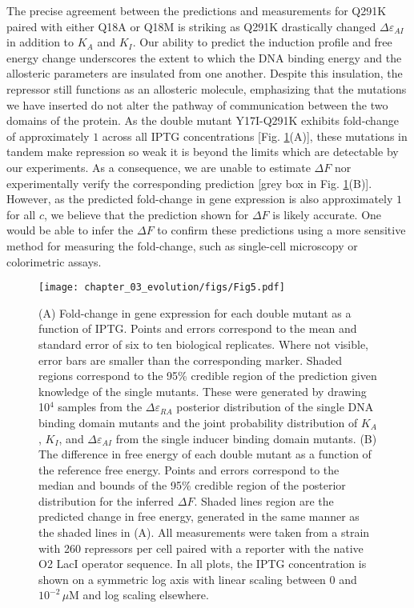 The precise agreement between the predictions and measurements for Q291K
paired with either Q18A or Q18M is striking as Q291K drastically changed
$\Delta\varepsilon_{AI}$ in addition to $K_A$ and $K_I$. Our ability to
predict the induction profile and free energy change underscores the extent
to which the DNA binding energy and the allosteric parameters are insulated
from one another. Despite this insulation, the repressor still functions as
an allosteric molecule, emphasizing that the mutations we have inserted do not
alter the pathway of communication between the two domains of
the protein. 
As the double mutant Y17I-Q291K exhibits fold-change of approximately $1$
across all IPTG concentrations [Fig. \ref{fig:dbl_muts}(A)], these mutations
in tandem make repression so weak it is beyond the limits which are
detectable by our experiments. As a consequence, we are unable to estimate
$\Delta F$ nor experimentally verify the corresponding prediction [grey box
in Fig. \ref{fig:dbl_muts}(B)]. However, as the predicted fold-change in gene
expression is also approximately $1$ for all $c$, we believe that the
prediction shown for $\Delta F$ is likely accurate. One would be able to
infer the $\Delta F$ to confirm these predictions using a more sensitive
method for measuring the fold-change, such as single-cell microscopy or
colorimetric assays. 

\begin{figure}
    \centering
    \texttt{[image: chapter\_03\_evolution/figs/Fig5.pdf]}
    \caption[Induction and free energy profiles of DNA binding and 
        inducer binding double mutants.]{(A) Fold-change in gene expression for
        each double mutant as a function of IPTG. Points and errors correspond
        to the mean and standard error of six to ten biological replicates.
        Where not visible, error bars are smaller than the corresponding marker. Shaded
        regions correspond to the 95\% credible region of the prediction given
        knowledge of the single mutants. These were generated by drawing 10$^4$
        samples from the $\Delta\varepsilon_{RA}$ posterior distribution of the
        single DNA binding domain mutants and the
        joint probability distribution of $K_A$, $K_I$, and
        $\Delta\varepsilon_{AI}$ from the single inducer binding domain mutants.
        (B) The difference in free energy of each double mutant as a function of
        the reference free energy. Points and errors correspond to the median
        and bounds of the 95\% credible region of the posterior distribution for
        the inferred $\Delta F$. Shaded lines region are the predicted change in
        free energy, generated in the same manner as the shaded lines in (A).
        All measurements were taken from a strain with 260 repressors per cell
        paired with a reporter with the native O2 LacI operator sequence. In
        all plots, the IPTG concentration is shown on a symmetric log axis with
        linear scaling between $0$ and $10^{-2}\,\mu$M and log scaling elsewhere.}
    \label{fig:dbl_muts}
\end{figure}
